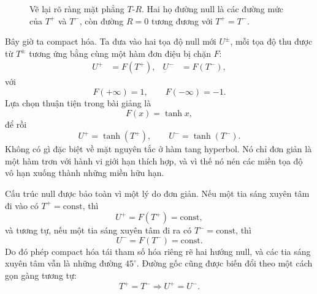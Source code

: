 \begin{figure}[htbp]
\centering
{}
\caption{Vẽ lại rõ ràng mặt phẳng \(T\)-\(R\). Hai họ đường null là các đường mức của \(T^+\) và \(T^-\), còn đường \(R=0\) tương đương với \(T^+=T^-\).}
\end{figure}

Bây giờ ta compact hóa. Ta đưa vào hai tọa độ null mới \(U^\pm\), mỗi tọa độ thu được từ \(T^\pm\) tương ứng bằng cùng một hàm đơn điệu bị chặn \(F\):
\begin{align}
U^+ &= F(T^+), &
U^- &= F(T^-),
\end{align}
với
\begin{equation}
F(+\infty)=1,
\qquad
F(-\infty)=-1.
\end{equation}
Lựa chọn thuận tiện trong bài giảng là
\begin{equation}
F(x)=\tanh x,
\end{equation}
để rồi
\begin{equation}
U^+ = \tanh(T^+),
\qquad
U^- = \tanh(T^-).
\end{equation}
Không có gì đặc biệt về mặt nguyên tắc ở hàm tang hyperbol. Nó chỉ đơn giản là một hàm trơn với hành vi giới hạn thích hợp, và vì thế nó nén các miền tọa độ vô hạn xuống thành những miền hữu hạn.

Cấu trúc null được bảo toàn vì một lý do đơn giản. Nếu một tia sáng xuyên tâm đi vào có \(T^+=\text{const}\), thì
\[
U^+=F(T^+)=\text{const},
\]
và tương tự, nếu một tia sáng xuyên tâm đi ra có \(T^-=\text{const}\), thì
\[
U^-=F(T^-)=\text{const}.
\]
Do đó phép compact hóa tái tham số hóa riêng rẽ hai hướng null, và các tia sáng xuyên tâm vẫn là những đường \(45^\circ\). Đường gốc cũng được biến đổi theo một cách gọn gàng tương tự:
\[
T^+=T^- \Longrightarrow U^+=U^-.
\]

